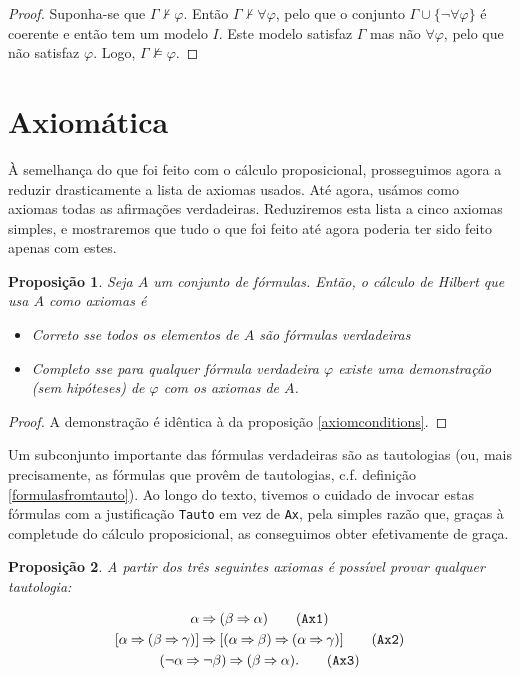 \documentclass{report}
\newtheorem{prop}{Proposição}
\theoremstyle{definition}
\theoremstyle{remark}
\newcommand{\imply}{\mathbin{\Rightarrow}}
\begin{document}
	\begin{proof}
	Suponha-se que $\Gamma \nvdash \varphi$. Então $\Gamma \nvdash \forall \varphi$, pelo que o conjunto $\Gamma \cup \{\neg \forall \varphi\}$ é coerente e então tem um modelo $I$. Este modelo satisfaz $\Gamma$ mas não $\forall \varphi$, pelo que não satisfaz $\varphi$. Logo, $\Gamma \nvDash \varphi$.
	\end{proof}
	

	\section{Axiomática}

	À semelhança do que foi feito com o cálculo proposicional, prosseguimos agora a reduzir drasticamente a lista de axiomas usados. Até agora, usámos como axiomas todas as afirmações verdadeiras. Reduziremos esta lista a cinco axiomas simples, e mostraremos que tudo o que foi feito até agora poderia ter sido feito apenas com estes.

	\begin{prop}
	Seja $A$ um conjunto de fórmulas. Então, o cálculo de Hilbert que usa $A$ como axiomas é

	\begin{itemize}
	\item Correto sse todos os elementos de $A$ são fórmulas verdadeiras

	\item Completo sse para qualquer fórmula verdadeira $\varphi$ existe uma demonstração (sem hipóteses) de $\varphi$ com os axiomas de $A$.
	\end{itemize}
	\end{prop}

	\begin{proof}
	A demonstração é idêntica à da proposição \ref{axiomconditions}.
	\end{proof}

	Um subconjunto importante das fórmulas verdadeiras são as tautologias (ou, mais precisamente, as fórmulas que provêm de tautologias, c.f. definição \ref{formulasfromtauto}). Ao longo do texto, tivemos o cuidado de invocar estas fórmulas com a justificação \texttt{Tauto} em vez de \texttt{Ax}, pela simples razão que, graças à completude do cálculo proposicional, as conseguimos obter efetivamente de graça.

	\begin{prop}
	A partir dos três seguintes axiomas é possível provar qualquer tautologia:

	\begin{gather}
	\alpha \imply (\beta \imply \alpha)\tag{\texttt{Ax1}}\label{fol:ax1}\\
	[\alpha \imply (\beta \imply \gamma)] \imply [(\alpha \imply \beta) \imply (\alpha \imply \gamma)]\tag{\texttt{Ax2}}\label{fol:ax2}\\
	(\neg \alpha \imply \neg \beta) \imply (\beta \imply \alpha).\tag{\texttt{Ax3}}\label{fol:ax3}
	\end{gather}
	\end{prop}
\end{document}
